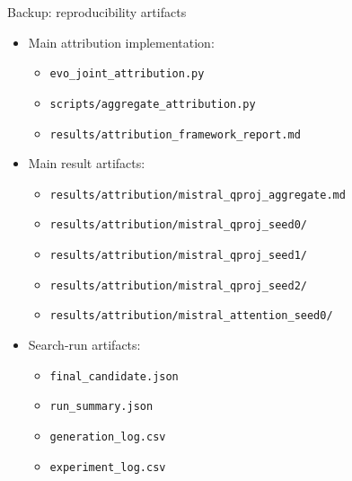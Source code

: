 \documentclass[aspectratio=169]{beamer}
\begin{document}

\begin{frame}{Backup: reproducibility artifacts}
\small
\begin{itemize}
    \item Main attribution implementation:
    \begin{itemize}
        \item \texttt{evo\_joint\_attribution.py}
        \item \texttt{scripts/aggregate\_attribution.py}
        \item \texttt{results/attribution\_framework\_report.md}
    \end{itemize}
    \item Main result artifacts:
    \begin{itemize}
        \item \texttt{results/attribution/mistral\_qproj\_aggregate.md}
        \item \texttt{results/attribution/mistral\_qproj\_seed0/}
        \item \texttt{results/attribution/mistral\_qproj\_seed1/}
        \item \texttt{results/attribution/mistral\_qproj\_seed2/}
        \item \texttt{results/attribution/mistral\_attention\_seed0/}
    \end{itemize}
    \item Search-run artifacts:
    \begin{itemize}
        \item \texttt{final\_candidate.json}
        \item \texttt{run\_summary.json}
        \item \texttt{generation\_log.csv}
        \item \texttt{experiment\_log.csv}
    \end{itemize}
\end{itemize}
\end{frame}

\end{document}
